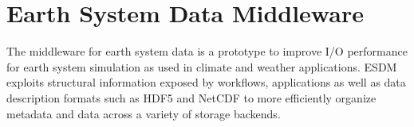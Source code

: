 \section{Earth System Data Middleware}%
\label{earth-system-data-middleware}

The middleware for earth system data is a prototype to improve I/O
performance for earth system simulation as used in climate and weather
applications. ESDM exploits structural information exposed by workflows,
applications as well as data description formats such as HDF5 and NetCDF
to more efficiently organize metadata and data across a variety of
storage backends.











